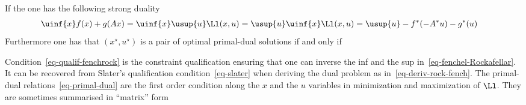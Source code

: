 \begin{thm}\label{thm-fenchel-Rockafellar}
If 
the one has the following strong duality
\begin{align}\label{eq-fenchel-Rockafellar}
	\uinf{x} f(x) + g(Ax) &= \uinf{x} \usup{u} \Ll(x,u) 
	= \usup{u} \uinf{x}\Ll(x,u)  
	= \usup{u} - f^*(-A^*u) - g^*(u)
\end{align}
Furthermore one has that $(x^\star,u^\star)$ is a pair of optimal primal-dual solutions if and only if
\end{thm}

Condition~\eqref{eq-qualif-fenchrock} is the constraint qualification ensuring that one can inverse the inf and the sup in~\eqref{eq-fenchel-Rockafellar}. It can be recovered from Slater's qualification condition~\eqref{eq-slater} when deriving the dual problem as in~\eqref{eq-deriv-rock-fench}.
%
The primal-dual relations~\eqref{eq-primal-dual} are the first order condition along the $x$ and the $u$ variables in minimization and maximization of $\Ll$. They are sometimes summarised in ``matrix'' form 
